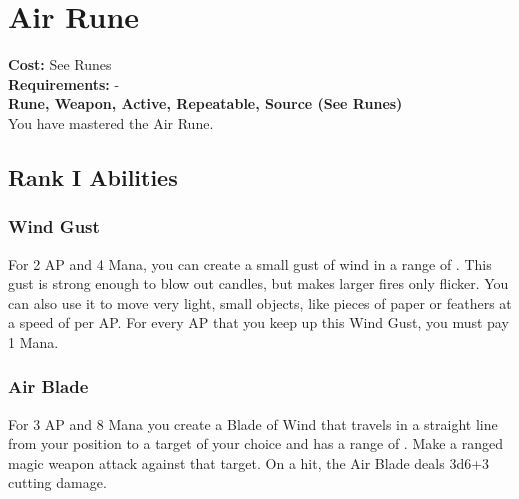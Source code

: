 \section{Air Rune}\label{rune:air}
\textbf{Cost:} See Runes\\
\textbf{Requirements:} -\\
\textbf{Rune, Weapon, Active, Repeatable, Source (See Runes)}\\
You have mastered the Air Rune.

\subsection{Rank I Abilities}

\subsubsection{Wind Gust}
For 2 AP and 4 Mana, you can create a small gust of wind in a range of .
This gust is strong enough to blow out candles, but makes larger fires only flicker.
You can also use it to move very light, small objects, like pieces of paper or feathers at a speed of  per AP.
For every AP that you keep up this Wind Gust, you must pay 1 Mana.

\subsubsection{Air Blade}
For 3 AP and 8 Mana you create a Blade of Wind that travels in a straight line from your position to a target of your choice and has a range of .
Make a ranged magic weapon attack against that target.
On a hit, the Air Blade deals 3d6+3 cutting damage.